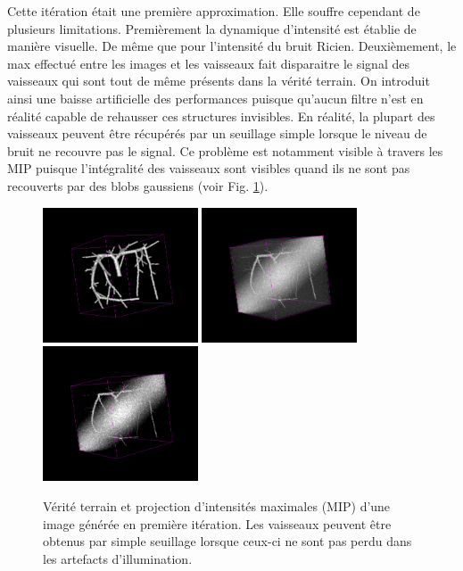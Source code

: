 Cette itération était une première approximation. Elle souffre cependant de plusieurs limitations. Premièrement la dynamique d'intensité est établie de manière visuelle. De même que pour l'intensité du bruit Ricien. Deuxièmement, le max effectué entre les images et les vaisseaux fait disparaitre le signal des vaisseaux qui sont tout de même présents dans la vérité terrain. On introduit ainsi une baisse artificielle des performances puisque qu'aucun filtre n'est en réalité capable de rehausser ces structures invisibles. En réalité, la plupart des vaisseaux peuvent être récupérés par un seuillage simple lorsque le niveau de bruit ne recouvre pas le signal. Ce problème est notamment visible à travers les MIP puisque l'intégralité des vaisseaux sont visibles quand ils ne sont pas recouverts par des blobs gaussiens (voir Fig. \ref{fig:vascu_v1_problems}).

\begin{figure}[h]
  \centering
  \includegraphics[height=4cm]{Images/vascu_v1_gt.png}
  \includegraphics[height=4cm]{Images/vascu_v1_original.png}
  \includegraphics[height=4cm]{Images/vascu_v1_thresholding.png}
  \caption{Vérité terrain et projection d'intensités maximales (MIP) d'une image générée en première itération. Les vaisseaux peuvent être obtenus par simple seuillage lorsque ceux-ci ne sont pas perdu dans les artefacts d'illumination.}
  \label{fig:vascu_v1_problems}
\end{figure}


